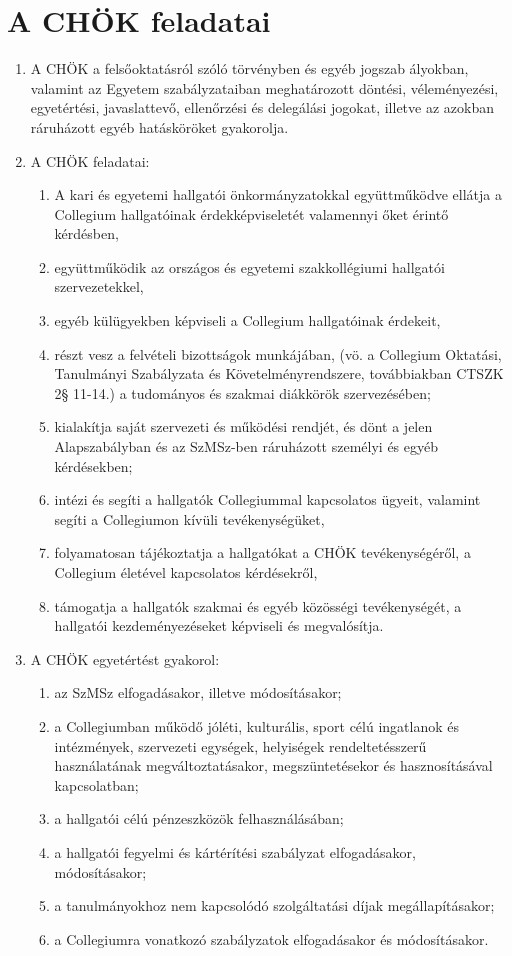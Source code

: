 \documentclass{rulebook}
\begin{document}
\section{A CHÖK feladatai}

\begin{enumerate}
	\item A CHÖK a felsőoktatásról szóló törvényben és egyéb jogszab	ályokban, valamint az Egyetem szabályzataiban meghatározott döntési, véleményezési, egyetértési, javaslattevő, ellenőrzési és delegálási jogokat, illetve az azokban ráruházott egyéb hatásköröket gyakorolja.
	\item  A CHÖK feladatai:
	\begin{enumerate}
		\item	A kari és egyetemi hallgatói önkormányzatokkal együttműködve ellátja a Collegium hallgatóinak érdekképviseletét valamennyi őket érintő kérdésben,
		\item	együttműködik az országos és egyetemi szakkollégiumi hallgatói szervezetekkel,
		\item	egyéb külügyekben képviseli a Collegium hallgatóinak érdekeit,
		\item	részt vesz a felvételi bizottságok munkájában, (vö. a Collegium Oktatási, Tanulmányi Szabályzata és Követelményrendszere, továbbiakban CTSZK 2§ 11-14.) a tudományos és szakmai diákkörök szervezésében;
		\item	kialakítja saját szervezeti és működési rendjét, és dönt a jelen Alapszabályban és az SzMSz-ben ráruházott személyi és egyéb kérdésekben;
		\item	intézi és segíti a hallgatók Collegiummal kapcsolatos ügyeit, valamint segíti a Collegiumon kívüli tevékenységüket,
		\item	folyamatosan tájékoztatja a hallgatókat a CHÖK tevékenységéről, a Collegium életével kapcsolatos kérdésekről,
		\item	támogatja a hallgatók szakmai és egyéb közösségi tevékenységét, a hallgatói kezdeményezéseket képviseli és megvalósítja.
	\end{enumerate}
	\item  A CHÖK egyetértést gyakorol:
	\begin{enumerate}
		\item	az SzMSz elfogadásakor, illetve módosításakor;
		\item	a Collegiumban működő jóléti, kulturális, sport célú ingatlanok és intézmények, szervezeti egységek, helyiségek rendeltetésszerű használatának megváltoztatásakor, megszüntetésekor és hasznosításával kapcsolatban;
		\item	a hallgatói célú pénzeszközök felhasználásában;
		\item	a hallgatói fegyelmi és kártérítési szabályzat elfogadásakor, módosításakor;
		\item	a tanulmányokhoz nem kapcsolódó szolgáltatási díjak megállapításakor;
		\item	a Collegiumra vonatkozó szabályzatok elfogadásakor és módosításakor.
	\end{enumerate}
\end{enumerate}
\end{document}
